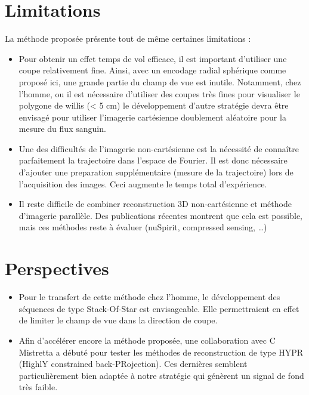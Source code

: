 \section{Limitations}

La méthode proposée présente tout de même certaines limitations :
\begin{itemize}
\item Pour obtenir un effet temps de vol efficace, il est important d’utiliser une coupe relativement fine. Ainsi, avec un encodage radial sphérique comme proposé ici, une grande partie du champ de vue est inutile. Notamment, chez l’homme, ou il est nécessaire d’utiliser des coupes très fines pour visualiser le polygone de willis (< 5 cm) le développement d’autre stratégie devra être envisagé pour utiliser l’imagerie cartésienne doublement aléatoire pour la mesure du flux sanguin. 
\item Une des difficultés de l’imagerie non-cartésienne est la nécessité de connaître parfaitement la trajectoire dans l’espace de Fourier. Il est donc nécessaire d’ajouter une preparation supplémentaire (mesure de la trajectoire) lors de l’acquisition des images. Ceci augmente le temps total d'expérience.
\item Il reste difficile de combiner reconstruction 3D non-cartésienne et méthode d’imagerie parallèle. Des publications récentes montrent que cela est possible, mais ces méthodes reste à évaluer (nuSpirit, compressed sensing, …)
\end{itemize}

\section{Perspectives}
\begin{itemize}
\item Pour le transfert de cette méthode chez l’homme, le développement des séquences de type Stack-Of-Star est envisageable. Elle permettraient en effet de limiter le champ de vue dans la direction de coupe.

\item Afin d’accélérer encore la méthode proposée, une collaboration avec C Mistretta a débuté pour tester les méthodes de reconstruction de type HYPR (HighlY constrained back-PRojection). Ces dernières semblent particulièrement bien adaptée à notre stratégie qui génèrent un signal de fond très faible.
\end{itemize}

%